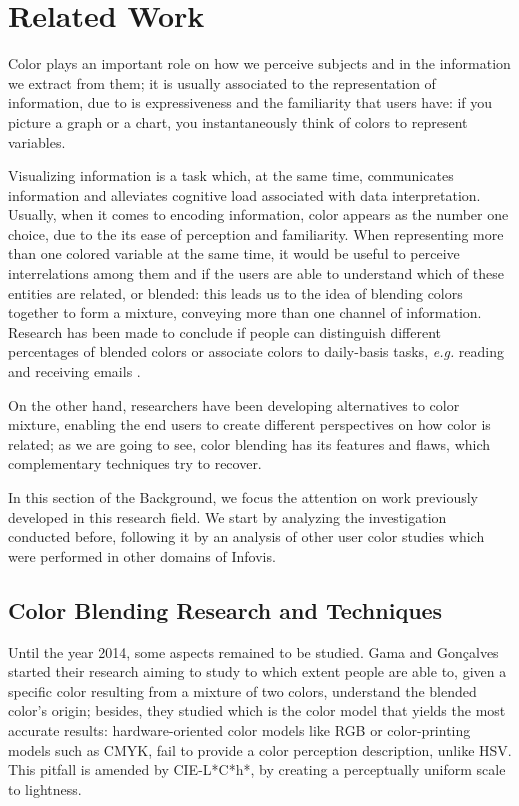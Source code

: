 \section{Related Work}
\label{sec:related_work}
%
Color plays an important role on how we perceive subjects and in the information we extract from them; it is usually
associated to the representation of information, due to is expressiveness and the familiarity that users have: if you
picture a graph or a chart, you instantaneously think of colors to represent variables. \par
%
Visualizing information is a task which, at the same time, communicates information and alleviates
cognitive load associated with data interpretation. Usually, when it comes to encoding information, color
appears as the number one choice, due to the its ease of perception and familiarity. When representing
more than one colored variable at the same time, it would be useful to perceive interrelations among
them and if the users are able to understand which of these entities are related, or blended: this leads
us to the idea of blending colors together to form a mixture, conveying more than one channel of information.
Research has been made to conclude if people can distinguish different percentages of blended colors or
associate colors to daily-basis tasks, \emph{e.g.} reading and receiving emails \cite{Gama20143}. \par
On the other hand, researchers have been developing alternatives to color mixture, enabling the end users
to create different perspectives on how color is related; as we are going to see, color blending has its
features and flaws, which complementary techniques try to recover. \par
%
In this section of the Background, we focus the attention on work previously developed in this research field. We
start by analyzing the investigation conducted before, following it by an analysis of other user color studies
which were performed in other domains of Infovis.
%
\subsection{Color Blending Research and Techniques}
\label{subsec:colorblending}
%
Until the year 2014, some aspects remained to be studied. Gama and Gonçalves started their research \cite{Gama20141}
aiming to study to which extent people are able to, given a specific color resulting from a mixture of
two colors, understand the blended color’s origin; besides, they studied which is the color model that
yields the most accurate results: hardware-oriented color models like RGB or color-printing models such
as CMYK, fail to provide a color perception description, unlike HSV. This pitfall is amended by CIE-L*C*h*,
by creating a perceptually uniform scale to lightness.  \par
%
